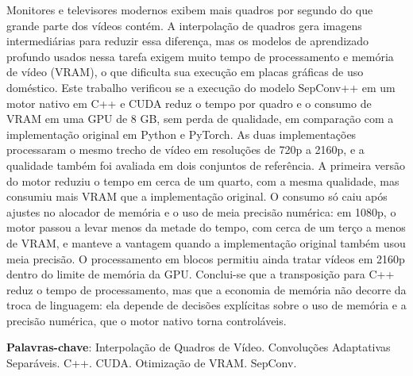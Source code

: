 \documentclass[
    12pt,                %
    openright,           %
    oneside,             %
    a4paper,             %
    english,             %
    brazil               %
]{abntex2}
\begin{document}

\frenchspacing

\pretextual

\imprimircapa

\imprimirfolhaderosto

\begin{resumo}
Monitores e televisores modernos exibem mais quadros por segundo do que grande parte dos vídeos contém. A interpolação de quadros gera imagens intermediárias para reduzir essa diferença, mas os modelos de aprendizado profundo usados nessa tarefa exigem muito tempo de processamento e memória de vídeo (VRAM), o que dificulta sua execução em placas gráficas de uso doméstico. Este trabalho verificou se a execução do modelo SepConv++ em um motor nativo em C++ e CUDA reduz o tempo por quadro e o consumo de VRAM em uma GPU de 8 GB, sem perda de qualidade, em comparação com a implementação original em Python e PyTorch. As duas implementações processaram o mesmo trecho de vídeo em resoluções de 720p a 2160p, e a qualidade também foi avaliada em dois conjuntos de referência. A primeira versão do motor reduziu o tempo em cerca de um quarto, com a mesma qualidade, mas consumiu mais VRAM que a implementação original. O consumo só caiu após ajustes no alocador de memória e o uso de meia precisão numérica: em 1080p, o motor passou a levar menos da metade do tempo, com cerca de um terço a menos de VRAM, e manteve a vantagem quando a implementação original também usou meia precisão. O processamento em blocos permitiu ainda tratar vídeos em 2160p dentro do limite de memória da GPU. Conclui-se que a transposição para C++ reduz o tempo de processamento, mas que a economia de memória não decorre da troca de linguagem: ela depende de decisões explícitas sobre o uso de memória e a precisão numérica, que o motor nativo torna controláveis.

\vspace{\onelineskip}

\noindent
\textbf{Palavras-chave}: Interpolação de Quadros de Vídeo. Convoluções Adaptativas Separáveis. C++. CUDA. Otimização de VRAM. SepConv.
\end{resumo}
\end{document}
